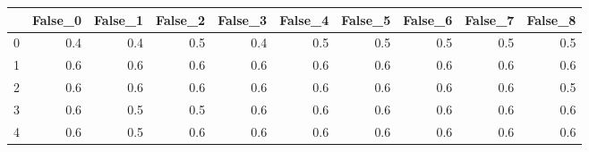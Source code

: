 \begin{tabular}{lrrrrrrrrr}
\toprule
{} &  False\_0 &  False\_1 &  False\_2 &  False\_3 &  False\_4 &  False\_5 &  False\_6 &  False\_7 &  False\_8 \\ \hline
\midrule
0 &      0.4 &      0.4 &      0.5 &      0.4 &      0.5 &      0.5 &      0.5 &      0.5 &      0.5 \\ \hline
1 &      0.6 &      0.6 &      0.6 &      0.6 &      0.6 &      0.6 &      0.6 &      0.6 &      0.6 \\ \hline
2 &      0.6 &      0.6 &      0.6 &      0.6 &      0.6 &      0.6 &      0.6 &      0.6 &      0.5 \\ \hline
3 &      0.6 &      0.5 &      0.5 &      0.6 &      0.6 &      0.6 &      0.6 &      0.6 &      0.6 \\ \hline
4 &      0.6 &      0.5 &      0.6 &      0.6 &      0.6 &      0.6 &      0.6 &      0.6 &      0.6 \\ \hline
\bottomrule
\end{tabular}

